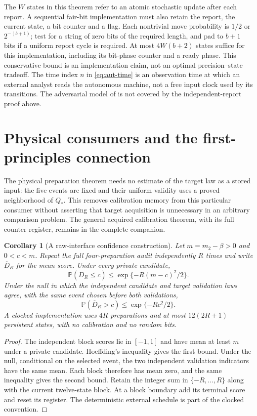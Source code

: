 \documentclass[11pt]{amsart}
\newtheorem{corollary}[theorem]{Corollary}
\theoremstyle{definition}\newtheorem{definition}[theorem]{Definition}
\theoremstyle{remark}\newtheorem{remark}[theorem]{Remark}
\newcommand{\Pp}{\mathbb P}
\newcommand{\1}{\mathbf 1}
\newcommand{\Qstar}{Q_*}
\begin{document}
The $W$ states in this theorem refer to an atomic stochastic update after
each report. A sequential fair-bit implementation must also retain the
report, the current state, a bit counter and a flag. Each nontrivial move
probability is $1/2$ or $2^{-(b+1)}$; test for a string of zero bits of
the required length, and pad to $b+1$ bits if a uniform report cycle is
required. At most $4W(b+2)$ states suffice for this implementation,
including its bit-phase counter and a ready phase. This conservative
bound is an implementation claim, not an optimal precision--state
tradeoff. The time index $n$ in \eqref{eq:aut-time} is an observation time
at which an external analyst reads the autonomous machine, not a free
input clock used by its transitions. The adversarial model of
\cite{MP} is not covered by the independent-report proof above.

\section{Physical consumers and the first-principles connection}
\label{sec:consumers}
The physical preparation theorem needs no estimate of the target law as
a stored input: the five events are fixed and their uniform validity uses
a proved neighborhood of $\Qstar$. This removes calibration memory from
this particular consumer without asserting that target acquisition is
unnecessary in an arbitrary comparison problem. The general acquired
calibration theorem, with its full counter register, remains in the
complete companion.

\begin{corollary}[A raw-interface confidence construction]\label{cor:confidence}
Let $m=m_2-\beta>0$ and $0<c<m$. Repeat the full four-preparation audit
independently $R$ times and write $\overline D_R$ for the mean score.
Under every private candidate,
\[
 \Pp(\overline D_R\le c)\le\exp\{-R(m-c)^2/2\}.
\]
Under the null in which the independent candidate and target validation
laws agree, with the same event chosen before both validations,
\[
 \Pp(\overline D_R>c)\le\exp\{-Rc^2/2\}.
\]
A clocked implementation uses $4R$ preparations and at most
$12(2R+1)$ persistent states, with no calibration and no random bits.
\end{corollary}
\begin{proof}
The independent block scores lie in $[-1,1]$ and have mean at least $m$
under a private candidate. Hoeffding's inequality gives the first bound.
Under the null, conditional on the selected event, the two independent
validation indicators have the same mean. Each block therefore has mean
zero, and the same inequality gives the second bound. Retain the integer
sum in $\{-R,\ldots,R\}$ along with the current twelve-state block.
At a block boundary add its terminal score and reset its register.
The deterministic external schedule is part of the clocked convention.
\end{proof}
\end{document}
